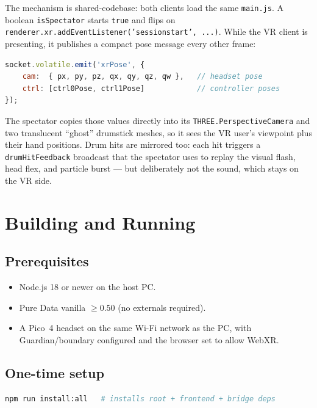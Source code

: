 \documentclass[11pt,a4paper]{article}
\begin{document}
The mechanism is shared-codebase: both clients load the same
\texttt{main.js}. A boolean \texttt{isSpectator} starts \texttt{true}
and flips on \texttt{renderer.xr.addEventListener('sessionstart', ...)}.
While the VR client is presenting, it publishes a compact pose
message every other frame:

\begin{lstlisting}[language=JavaScript]
socket.volatile.emit('xrPose', {
    cam:  { px, py, pz, qx, qy, qz, qw },   // headset pose
    ctrl: [ctrl0Pose, ctrl1Pose]            // controller poses
});
\end{lstlisting}

The spectator copies those values directly into its
\texttt{THREE.PerspectiveCamera} and two translucent ``ghost''
drumstick meshes, so it sees the VR user's viewpoint plus their hand
positions. Drum hits are mirrored too: each hit triggers a
\texttt{drumHitFeedback} broadcast that the spectator uses to replay
the visual flash, head flex, and particle burst --- but deliberately
not the sound, which stays on the VR side.

\section{Building and Running}

\subsection{Prerequisites}

\begin{itemize}[leftmargin=2em]
    \item Node.js 18 or newer on the host PC.
    \item Pure Data vanilla $\geq 0.50$ (no externals required).
    \item A Pico~4 headset on the same Wi-Fi network as the PC, with
          Guardian/boundary configured and the browser set to allow
          WebXR.
\end{itemize}

\subsection{One-time setup}

\begin{lstlisting}[language=bash]
npm run install:all   # installs root + frontend + bridge deps
\end{lstlisting}
\end{document}
